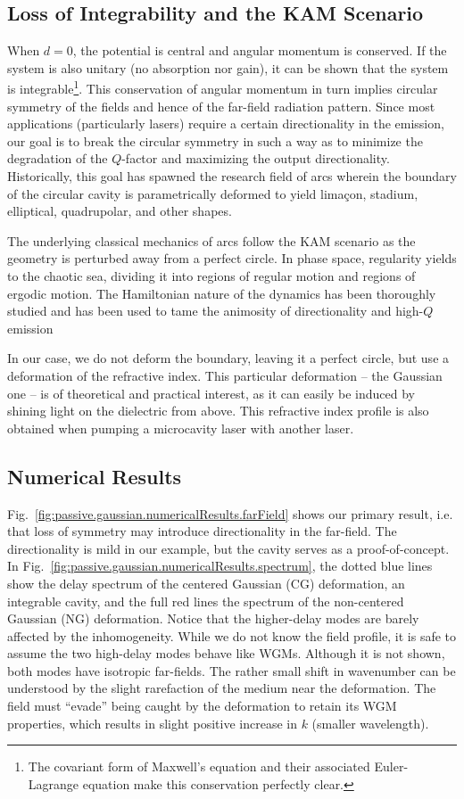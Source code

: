 \subsection{Loss of Integrability and the KAM Scenario}
When $d=0$, the potential is central and angular momentum is 
conserved. If the system is also unitary
(no absorption nor gain), it can be shown that the system is
integrable\footnote{The covariant form of Maxwell's equation and their
associated Euler-Lagrange equation make this conservation perfectly clear.}. 
This conservation of angular momentum in turn
implies circular symmetry of the fields and hence of the 
far-field radiation pattern. Since most applications (particularly lasers)
require a certain directionality in the emission, our goal is to break 
the circular symmetry in such a way as to minimize the degradation of the
$Q$-factor and maximizing the output directionality. Historically, 
this goal has spawned the research field of \glspl{arc} \cite{NOC1997,HEN2002b,SCH2004a,TUR2005,HIS2013,SHU2013} wherein the boundary
of the circular cavity is parametrically deformed to yield limaçon, stadium, 
elliptical, quadrupolar, and other shapes. 

The underlying classical mechanics of \glspl{arc} follow the KAM scenario 
as the geometry is perturbed away from a perfect circle. In phase space, 
regularity yields to the chaotic sea, dividing it into regions of regular
motion and regions of ergodic motion. The Hamiltonian nature of the 
dynamics has been thoroughly studied and has been used to tame the 
animosity of directionality and high-$Q$ emission \cite{KWA2013,KIM2013}

In our case, we do not deform the boundary, leaving it a perfect circle, 
but use a deformation of the refractive index. This particular deformation
-- the Gaussian one -- 
is of theoretical and practical interest, as it can easily be induced
by shining light on the dielectric from above. This refractive
index profile is also obtained when pumping a microcavity laser
with another laser.

\subsection{Numerical Results}
Fig.~\ref{fig:passive.gaussian.numericalResults.farField} shows our primary
result, i.e. that loss of symmetry may introduce directionality
in the far-field. The directionality is mild in our example, but the 
cavity serves as a proof-of-concept. In Fig.~\ref{fig:passive.gaussian.numericalResults.spectrum}, 
the dotted blue lines show the delay spectrum of the centered Gaussian (CG) deformation, 
an integrable cavity, and the full red lines the spectrum of the non-centered Gaussian
(NG) deformation. Notice that the higher-delay modes are barely affected by 
the inhomogeneity. While we do not know the field profile, 
it is safe to assume the two high-delay modes behave like WGMs. Although it is not shown, 
both modes have isotropic far-fields. The rather small shift in wavenumber can be
understood by the slight rarefaction of the medium near the deformation. 
The field must ``evade'' being caught by the deformation to retain
its WGM properties, which results in slight positive increase in $k$ (smaller wavelength). 

